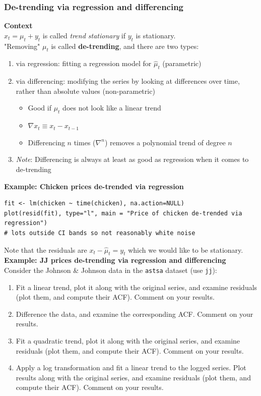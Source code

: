 \documentclass[11pt]{article}
\newcommand{\noi}{\noindent}
\begin{document}
\subsubsection{De-trending via regression and differencing}
\noi \textbf{Context} \\
\noi $x_t = \mu_t + y_t$ is called \textit{trend stationary} if $y_t$ is stationary. \\

\noi "Removing" $\mu_t$ is called \textbf{de-trending}, and there are two types:
\begin{enumerate}
    \item via regression: fitting a regression model for $\hat \mu_t$ (parametric)
    \item via differencing: modifying the series by looking at differences over time, rather than absolute values (non-parametric)
        \begin{itemize}
            \item Good if $\mu_t$ does not look like a linear trend
            \item $\nabla x_t \equiv x_t - x_{t-1}$
            \item Differencing $n$ times ($\nabla^n$) removes a polynomial trend of degree $n$
        \end{itemize}
    \item \textit{Note}: Differencing is always at least as good as regression when it comes to de-trending
\end{enumerate} \phantom{i}

\noi \textbf{Example: Chicken prices de-trended via regression}
\begin{lstlisting}
fit <- lm(chicken ~ time(chicken), na.action=NULL)
plot(resid(fit), type="l", main = "Price of chicken de-trended via regression")
# lots outside CI bands so not reasonably white noise
\end{lstlisting}
\noi Note that the residuals are $x_t - \hat \mu_t = y_t$ which we would like to be stationary. \\

\noi \textbf{Example: JJ prices de-trending via regression and differencing}\\
\noi Consider the Johnson \& Johnson data in the \texttt{astsa} dataset (use \texttt{jj}):
\begin{enumerate}
    \item Fit a linear trend, plot it along with the original series, and examine residuals (plot them, and compute their ACF). Comment on your results.
    \item Difference the data, and examine the corresponding ACF. Comment on your results.
    \item Fit a quadratic trend, plot it along with the original series, and examine residuals (plot them, and compute their ACF). Comment on your results.
    \item Apply a log transformation and fit a linear trend to the logged series. Plot results along with the original series, and examine residuals (plot them, and compute their ACF). Comment on your results.
\end{enumerate}
\end{document}
